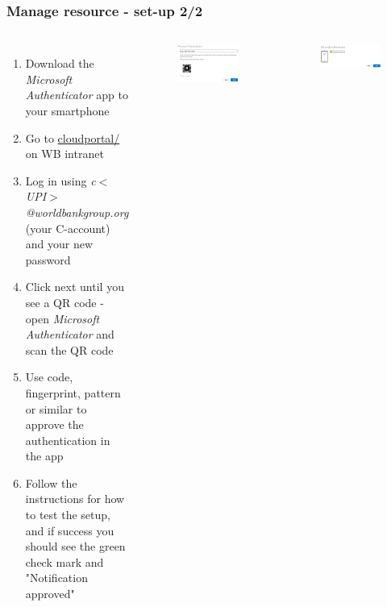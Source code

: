 \documentclass[aspectratio=169]{beamer} %
\begin{document}
\begin{frame}
	\frametitle{Manage resource - set-up 2/2}
	\begin{columns}[c]
		
		
		\begin{enumerate}
			\item Download the \textit{Microsoft Authenticator} app to your smartphone
			\item Go to \url{cloudportal/} on WB intranet
			\item Log in using \textit{c$<$UPI$>$@worldbankgroup.org} (your C-account) and your new password
			\item Click next until you see a QR code - open \textit{Microsoft Authenticator} and scan the QR code
			\item Use code, fingerprint, pattern or similar to approve the authentication in the app
			\item Follow the instructions for how to test the setup, and if success you should see the green check mark and "Notification approved"
			
		\end{enumerate}
		
		\begin{figure}
			\centering
			\includegraphics[width=1\textwidth]{./img/microsoft-auth-1.png}
		\end{figure}
			\begin{figure}
			\centering
			\includegraphics[width=1\textwidth]{./img/microsoft-auth-2.png}
		\end{figure}
			
	\end{columns}
\end{frame}
\end{document}

